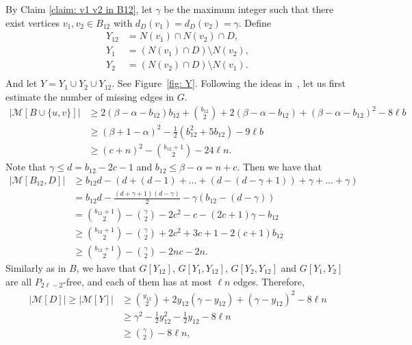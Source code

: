 \documentclass[12pt]{article}%
\begin{document}
By Claim \ref{claim: v1 v2 in B12}, let $\gamma$ be the maximum integer such that there exist vertices $v_1, v_2 \in B_{12}$ with $d_D(v_1) = d_D(v_2) = \gamma$.
Define
\begin{equation*}
\begin{aligned}
	Y_{12} &= N(v_1) \cap N(v_2) \cap D,\\
	Y_1 &= \left(N(v_1) \cap D\right) \setminus N(v_2),\\
	Y_2 &= \left(N(v_2) \cap D\right) \setminus N(v_1).\\
\end{aligned}
\end{equation*}
And let $Y=Y_1\cup Y_2\cup Y_{12}$.
See Figure~\ref{fig: Y}.
Following the ideas in~\cite{2025arXiv250500523L}, let us first estimate the number of missing edges in $G$.
\begin{equation}\label{eq: M[B]}
	\begin{aligned}		
		|\mathcal{M}[B \cup \{u,v\}]| & \ge 2(\beta - \alpha - b_{12})b_{12} + \binom{b_{12}}{2} + 2(\beta - \alpha - b_{12}) + (\beta-\alpha - b_{12})^2 - 8\ell b\\
		& \ge (\beta +1 - \alpha)^2 - \frac{1}{2}(b_{12}^2 + 5b_{12}) - 9\ell b\\
		& \ge (c+n)^2 - \binom{b_{12}+1}{2} - 24\ell n.
	\end{aligned}
	\end{equation}
	Note that $\gamma \le d = b_{12}-2c-1$ and $b_{12} \le \beta - \alpha = n+c$. Then we have that
	\begin{equation}\label{eq: M[B12,D]}
	\begin{aligned}
		|\mathcal{M}[B_{12}, D]|  &\ge b_{12}d - (d + (d - 1) + \ldots +(d-(d-\gamma+1))+ \gamma  + \ldots + \gamma ) \\
		& = b_{12}d - \frac{(d+\gamma+1)(d-\gamma)}{2} - \gamma(b_{12}-(d-\gamma)) \\
		& = \binom{b_{12}+1}{2} - \binom{\gamma}{2} -2c^2 - c - (2c+1)\gamma - b_{12}\\
		& \ge \binom{b_{12}+1}{2} - \binom{\gamma}{2} +2c^2+3c+1-2(c+1)b_{12}\\
		& \ge \binom{b_{12}+1}{2} - \binom{\gamma}{2} -2nc - 2n.
 	\end{aligned}
	\end{equation}
	Similarly as in $B$, we have that $G[Y_{12}]$, $G[Y_1, Y_{12}]$, $G[Y_2, Y_{12}]$ and $G[Y_1, Y_2]$ are all $P_{2\ell-2}$-free, and each of them has at most $\ell n$ edges.
	Therefore,
	\begin{equation}\label{eq: M[Y]}
	\begin{aligned}
	\left|\mathcal{M}[D] \right|\geq \left|\mathcal{M}[Y]\right| & \ge \binom{y_{12}}{2} + 2y_{12}(\gamma - y_{12}) + (\gamma-y_{12})^2 - 8\ell n \\
		& \ge \gamma^2 - \frac{1}{2}y_{12}^2 - \frac{1}{2}y_{12} - 8\ell n\\
		& \ge \binom{\gamma}{2} - 8\ell n,
	\end{aligned}
	\end{equation}
\end{document}
